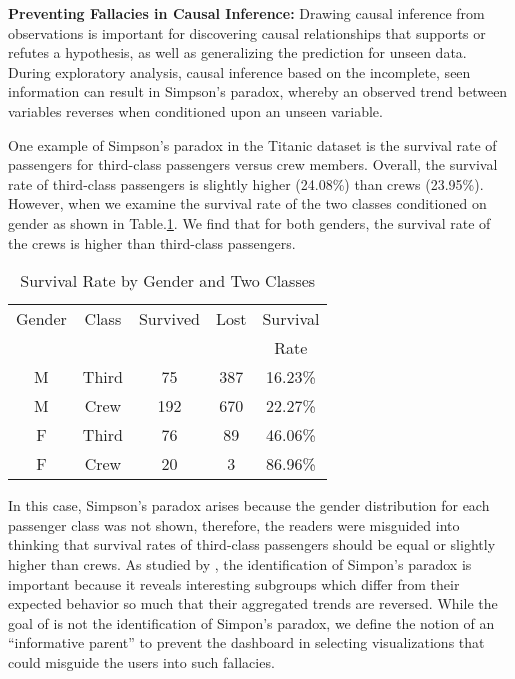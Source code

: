 \textbf{Preventing Fallacies in Causal Inference:} Drawing causal inference from observations is important for discovering causal relationships that supports or refutes a hypothesis, as well as generalizing the prediction for unseen data. During exploratory analysis, causal inference based on the incomplete, seen information can result in Simpson's paradox, whereby an observed trend between variables reverses when conditioned upon an unseen variable. 
\par One example of Simpson's paradox in the Titanic dataset is the survival rate of passengers for third-class passengers versus crew members. Overall, the survival rate of third-class passengers is slightly higher (24.08\%) than crews (23.95\%). However, when we examine the survival rate of the two classes conditioned on gender as shown in Table.\ref{tab:t2}. We find that for both genders, the survival rate of the crews is higher than third-class passengers.  
\begin{table}[thb]
	\caption{Survival Rate by Gender and Two Classes}
    \label{tab:t2}
	\begin{center}    
	\begin{tabular}{ccccc}
	\toprule
	Gender & Class & Survived & Lost & Survival\\
	& & & & Rate\\
	\midrule
	M & Third & 75 & 387 & 16.23\%\\ 
	M & Crew & 192 & 670 & 22.27\%\\ 
	\bottomrule
    F & Third & 76 & 89 & 46.06\%\\ 
	F & Crew & 20 & 3 & 86.96\%\\ 
	\bottomrule
	\end{tabular}
    \end{center}
\end{table}
In this case, Simpson's paradox arises because the gender distribution for each passenger class was not shown, therefore, the readers were misguided into thinking that survival rates of third-class passengers should be equal or slightly higher than crews.
As studied by \cite{Alipourfard2018,Guo2017}, the identification of Simpon's paradox is important because it reveals interesting subgroups which differ from their expected behavior so much that their aggregated trends are reversed. While the goal of \system is not the identification of Simpon's paradox, we define the notion of an ``informative parent'' to prevent the dashboard in selecting visualizations that could misguide the users into such fallacies. 

